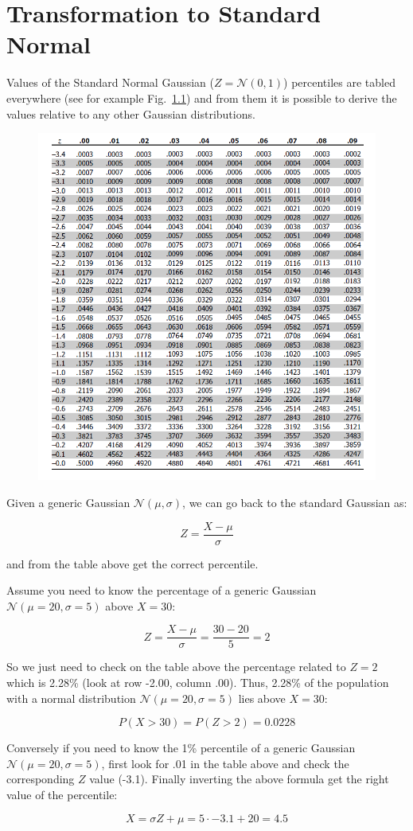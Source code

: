 \chapter{Transformation to Standard
  Normal}\label{transformation-to-standard-normal}

Values of the Standard Normal Gaussian (\(Z = \mathcal{N}(0,1)\))
percentiles are tabled everywhere (see for example Fig.~\ref{fig:normpercentile}) and from them it is possible to
derive the values relative to any other Gaussian distributions.

\begin{figure}[tb]
\centering
\includegraphics[width=1.\textwidth]{figures/norm_gauss_percentile}
\label{fig:normpercentile}
\end{figure}

Given a generic Gaussian \(\mathcal{N}(\mu , \sigma)\), we can go back
to the standard Gaussian as:

\[Z= \frac{X-\mu}{\sigma}\]

and from the table above get the correct percentile.

Assume you need to know the percentage of a generic Gaussian
\(\mathcal{N}(\mu=20 ,\sigma=5)\) above \(X=30\):

\[Z=\frac{X-\mu}{\sigma} = \frac{30-20}{5}=2\]

So we just need to check on the table above the percentage related to
\(Z=2\) which is 2.28\% (look at row -2.00, column .00). Thus, 2.28\% of
the population with a normal distribution
\(\mathcal{N}(\mu=20 ,\sigma=5)\) lies above \(X=30\):

\[P(X>30)=P(Z>2)=0.0228\]

Conversely if you need to know the 1\% percentile of a generic Gaussian
\(\mathcal{N}(\mu=20 ,\sigma=5)\), first look for .01 in the table above
and check the corresponding \(Z\) value (-3.1). Finally inverting the
above formula get the right value of the percentile:

\[ X= \sigma Z + \mu = 5\cdot -3.1 + 20 = 4.5 \]
